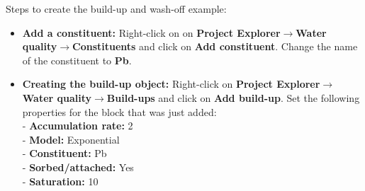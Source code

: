 Steps to create the build-up and wash-off example:
\begin{itemize}
   \item \textbf{Add a constituent: } Right-click on on \textbf{Project Explorer}$\rightarrow$\textbf{Water quality}$\rightarrow$\textbf{Constituents} and click on \textbf{Add constituent}. Change the name of the constituent to \textbf{Pb}.
    \item \textbf{Creating the build-up object: } Right-click on \textbf{Project Explorer}$\rightarrow$\textbf{Water quality}$\rightarrow$\textbf{Build-ups} and click on \textbf{Add build-up}. 
    Set the following properties for the block that was just added: \\
    - \textbf{Accumulation rate: } 2\\
    - \textbf{Model: } Exponential \\
    - \textbf{Constituent: } Pb \\
    - \textbf{Sorbed/attached: } Yes \\
    - \textbf{Saturation: } 10 \\
    

\end{itemize}
